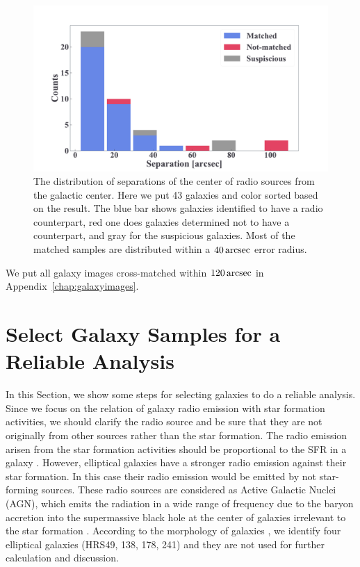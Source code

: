 \begin{figure}[htbp]
	\centering
	\includegraphics[width=.8\linewidth]{Chapter_4/Figures/Method_separation.pdf}
    \caption[Separation from the cross-matching]{\label{fig:separation}
        The distribution of separations of the center of radio sources from the galactic center.
        Here we put 43 galaxies and color sorted based on the result.
        The blue bar shows galaxies identified to have a radio counterpart, red one does galaxies determined not to have a counterpart, and gray for the suspicious galaxies.
        Most of the matched samples are distributed within a $40\,\mathrm{arcsec}$ error radius.
    }
\end{figure}

We put all galaxy images cross-matched within $120\,\mathrm{arcsec}$ in Appendix~\ref{chap:galaxyimages}.



\section{Select Galaxy Samples for a Reliable Analysis}\label{sec:reducegalaxysamples}

In this Section, we show some steps for selecting galaxies to do a reliable analysis.
Since we focus on the relation of galaxy radio emission with star formation activities, we should clarify the radio source and be sure that they are not originally from other sources rather than the star formation.
The radio emission arisen from the star formation activities should be proportional to the SFR in a galaxy \citep{Condon1992a, Murphy2011}.
However, elliptical galaxies have a stronger radio emission against their star formation.
In this case their radio emission would be emitted by not star-forming sources.
These radio sources are considered as Active Galactic Nuclei (AGN), which emits the radiation in a wide range of frequency due to the baryon accretion into the supermassive black hole at the center of galaxies irrelevant to the star formation \citep[e.g.,][]{Urry1995, Padovani2017}.
According to the morphology of galaxies \citep{Cortese2012}, we identify four elliptical galaxies (HRS49, 138, 178, 241) and they are not used for further calculation and discussion.

